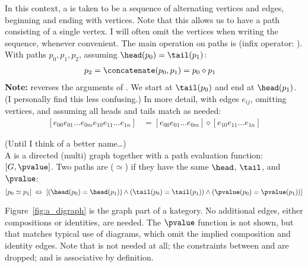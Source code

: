 \documentclass[11pt,openany]{book}
\begin{document}
\begin{definition}[Paths]
In this context, a  is taken to be a sequence of
alternating vertices and edges, beginning and ending 
with vertices. 
Note that this allows us to have a path consisting 
of a single vertex.
I will often omit the vertices when writing the sequence,
whenever convenient.
The main operation on paths is \concatenate
(infix operator: \conop).
With paths $p_0,p_1,p_2$,
assuming $\head(p_0) = \tail(p_1)$: 
\begin{align*}
p_2 & = \concatenate(p_0,p_1) = p_0 \diamond p_1
\end{align*}
\textbf{Note:} \concatenate reverses the arguments
of \compose. 
We start at $\tail(p_0)$ and end at 
$\head(p_1)$.
(I personally find this less confusing.)
In more detail, with edges $e_{ij}$,
omitting vertices, 
and assuming all heads and tails match as needed:
\begin{align*}
\left[ e_{00} e_{01} \ldots e_{0m}
e_{10} e_{11} \ldots e_{1n}
 \right]
& = 
\left[ e_{00} e_{01} \ldots e_{0m} \right]
\diamond
\left[ e_{10} e_{11} \ldots e_{1n} \right]
\end{align*}
\end{definition}

\begin{definition}
(Until I think of a better name\ldots)\\
A  is a directed (multi) graph together with
a path evaluation function: $\left[G, \pvalue\right]$.
Two paths are  ($\simeq$) 
if they have the same 
$\head$, $\tail$, and $\pvalue$:
\[
\left[ p_0 \simeq p_1 \right]
\;  \Leftrightarrow \;
\left[
\left( \head(p_0) = \head(p_1) \right)
\wedge
\left( \tail(p_0) = \tail(p_1) \right)
\wedge
\left( \pvalue(p_0) = \pvalue(p_1) \right)
\right]
\]
\end{definition}

Figure~\ref{fig:a_digraph} is the graph part of a kategory.
No additional edges, either compositions or identities, are
needed. 
The $\pvalue$  function is not shown,
but that matches typical
use of diagrams, which omit the implied
composition and identity edges.
Note that \identity is not needed at all;
the constraints between \identity and \compose
are dropped; and \concatenate is associative by definition.

\label{sec:Kategory_from_category}
\end{document}
